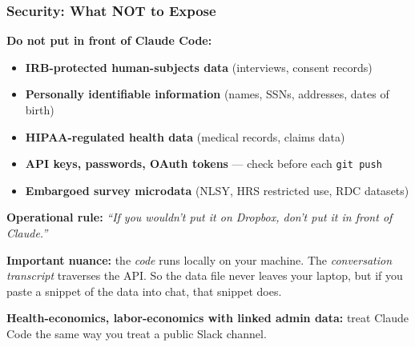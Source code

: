 \documentclass[10pt,english,aspectratio=169]{beamer}
\begin{document}
\begin{frame}
\frametitle{Security: What NOT to Expose}

\textbf{Do not put in front of Claude Code:}
\begin{itemize}
    \item \textbf{IRB-protected human-subjects data} (interviews, consent records)
    \item \textbf{Personally identifiable information} (names, SSNs, addresses, dates of birth)
    \item \textbf{HIPAA-regulated health data} (medical records, claims data)
    \item \textbf{API keys, passwords, OAuth tokens} --- check before each \texttt{git push}
    \item \textbf{Embargoed survey microdata} (NLSY, HRS restricted use, RDC datasets)
\end{itemize}

\vspace{0.3cm}

\textbf{Operational rule:} \textit{``If you wouldn't put it on Dropbox, don't put it in front of Claude.''}

\vspace{0.3cm}

\textbf{Important nuance:} the \textit{code} runs locally on your machine. The \textit{conversation transcript} traverses the API. So the data file never leaves your laptop, but if you paste a snippet of the data into chat, that snippet does.

\vspace{0.2cm}

\textbf{Health-economics, labor-economics with linked admin data:} treat Claude Code the same way you treat a public Slack channel.
\end{frame}
\end{document}
